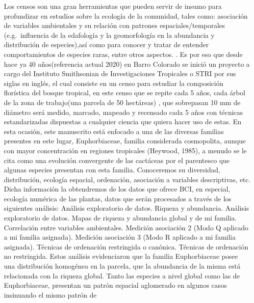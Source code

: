 \documentclass[11pt,]{article}
\renewenvironment{abstract}
 {{%
    \setlength{\leftmargin}{0mm}
    \setlength{\rightmargin}{\leftmargin}%
  }%
  \relax}
 {\endlist}
\begin{document}
\begin{abstract}

    \hbox{\vrule height .2pt width 39.14pc}

    \vskip 8.5pt %

\noindent Los censos son una gran herramientas que pueden servir de insumo para
profundizar en estudios sobre la ecología de la comunidad, tales como:
asociación de variables ambientales y su relación con patrones
espaciales/temporales (e.g.~influencia de la edafología y la
geomorfología en la abundancia y distribución de especies),así como para
conocer y tratar de entender comportamientos de especies raras, entre
otros aspectos. . Es por eso que desde hace ya 40 años(referencia actual
2020) en Barro Colorado se inició un proyecto a cargo del Instituto
Smithsonian de Investigaciones Tropicales o STRI por sus siglas en
inglés, el cual consiste en un censo para estudiar la composición
florística del bosque tropical, en este censo que se repite cada 5 años,
cada árbol de la zona de trabajo(una parcela de 50 hectáreas) , que
sobrepasan 10 mm de diámetro será medido, marcado, mapeado y recensado
cada 5 años con técnicas estandarizadas dispuestas a cualquier ciencia
que quiera hacer uso de estas. En esta ocasión, este manuscrito está
enfocado a una de las diversas familias presentes en este lugar,
Euphorbiaceae, familia considerada cosmopolita, aunque con mayor
concentración en regiones tropicales (Heywood, 1985), a menudo se le
cita como una evolución convergente de las cactáceas por el parentesco
que algunas especies presentan con esta familia. Conoceremos su
diversidad, distribución, ecología espacial, ordenación, asociación a
variables descriptivas, etc. Dicha información la obtendremos de los
datos que ofrece BCI, en especial, ecología numérica de las plantas,
datos que serán procesados a través de los siguientes análisis: Análisis
exploratorio de datos. Riqueza y abundancia. Análisis exploratorio de
datos. Mapas de riqueza y abundancia global y de mi familia. Correlación
entre variables ambientales. Medición asociación 2 (Modo Q aplicado a mi
familia asignada). Medición asociación 3 (Modo R aplicado a mi familia
asignada). Técnicas de ordenación restringida o canónica. Técnicas de
ordenación no restringida. Estos análisis evidenciaron que la familia
Euphorbiaceae posee una distribución homogénea en la parcela, que la
abundancia de la misma está relacionada con la riqueza global. Tanto las
especies a nivel global como las de Euphorbiaceae, presentan un patrón
espacial aglomerado en algunos casos insinuando el mismo patrón de

\end{abstract}
\end{document}

